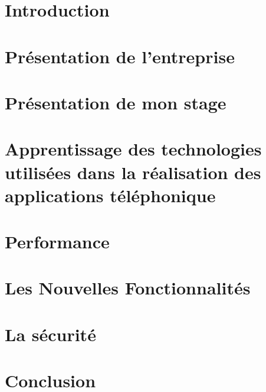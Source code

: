 \documentclass[asi]{picINSA}
\begin{document}
 \couverture{}
 \informationsGenerales{}


 
 \tableofcontents

 \listoffigures

 \chapter{Introduction}
 	
 	
 \chapter{Présentation de l'entreprise}
	

 \chapter{Présentation de mon stage}
	
 
 \chapter{Apprentissage des technologies utilisées dans la réalisation des applications téléphonique}
 	

 \chapter{Performance}
	

 \chapter{Les Nouvelles Fonctionnalités}
	

 \chapter{La sécurité}
	

 \chapter{Conclusion}
	

 \pageQuatriemeCouverture{}	
\end{document}
